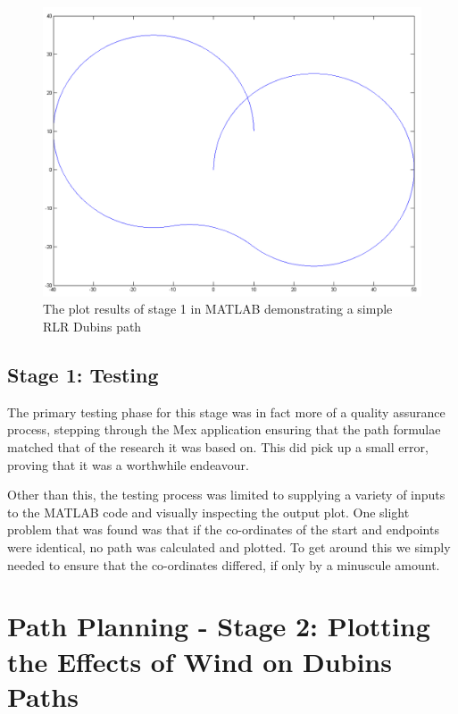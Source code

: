 \begin{figure}[htbp!] 
\centering    
\includegraphics[width=\textwidth]{PP1_Demo}
\caption[Plotting Dubins paths in MATLAB]{The plot results of stage 1 in MATLAB demonstrating a simple RLR Dubins path}
\label{fig:pp1demo}
\end{figure}

\subsection{Stage 1: Testing}
\label{task1:stage1:testing}

The primary testing phase for this stage was in fact more of a quality assurance process, stepping through the Mex application ensuring that the path formulae matched that of the research it was based on. This did pick up a small error, proving that it was a worthwhile endeavour. 

Other than this, the testing process was limited to supplying a variety of inputs to the MATLAB code and visually inspecting the output plot. One slight problem that was found was that if the co-ordinates of the start and endpoints were identical, no path was calculated and plotted. To get around this we simply needed to ensure that the co-ordinates differed, if only by a minuscule amount. 


\section{Path Planning - Stage 2: Plotting the Effects of Wind on Dubins Paths}
\label{task1:stage2}


